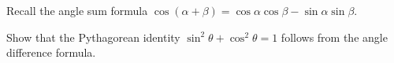 \begin{frame}
Recall the angle sum formula $\cos (\alpha+\beta)= \cos\alpha\cos\beta- \sin \alpha\sin\beta$.
\begin{example}
Show that the Pythagorean identity $\sin^2\theta+\cos^2\theta=1$ follows from the angle difference formula.
\end{example}
\end{frame}